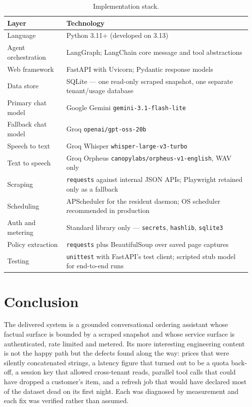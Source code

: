 \documentclass[11pt,a4paper]{article}
\newcommand{\code}[1]{\texttt{\small #1}}
\begin{document}
\begin{table}[htbp]
\centering
\caption{Implementation stack.}
\label{tab:stack}
\small
\begin{tabularx}{\textwidth}{@{}l X@{}}
\toprule
\textbf{Layer} & \textbf{Technology} \\
\midrule
Language & Python 3.11+ (developed on 3.13) \\
Agent orchestration & LangGraph; LangChain core message and tool abstractions \\
Web framework & FastAPI with Uvicorn; Pydantic response models \\
Data store & SQLite --- one read-only scraped snapshot, one separate tenant/usage database \\
Primary chat model & Google Gemini \code{gemini-3.1-flash-lite} \\
Fallback chat model & Groq \code{openai/gpt-oss-20b} \\
Speech to text & Groq Whisper \code{whisper-large-v3-turbo} \\
Text to speech & Groq Orpheus \code{canopylabs/orpheus-v1-english}, WAV only \\
Scraping & \code{requests} against internal JSON APIs; Playwright retained only as a fallback \\
Scheduling & APScheduler for the resident daemon; OS scheduler recommended in production \\
Auth and metering & Standard library only --- \code{secrets}, \code{hashlib}, \code{sqlite3} \\
Policy extraction & \code{requests} plus BeautifulSoup over saved page captures \\
Testing & \code{unittest} with FastAPI's test client; scripted stub model for end-to-end runs \\
\bottomrule
\end{tabularx}
\end{table}

\section{Conclusion}

The delivered system is a grounded conversational ordering assistant whose
factual surface is bounded by a scraped snapshot and whose service surface is
authenticated, rate limited and metered. Its more interesting engineering
content is not the happy path but the defects found along the way: prices that
were silently concatenated strings, a latency figure that turned out to be a
quota back-off, a session key that allowed cross-tenant reads, parallel tool
calls that could have dropped a customer's item, and a refresh job that would
have declared most of the dataset dead on its first night. Each was diagnosed
by measurement and each fix was verified rather than assumed.
\end{document}
